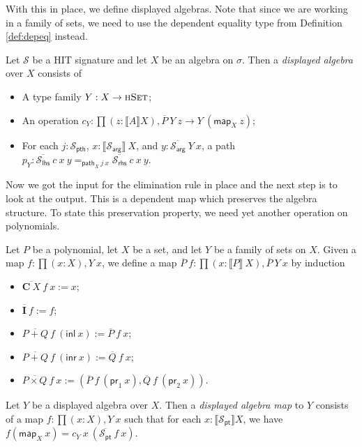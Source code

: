 \documentclass[9pt]{entcs}
\newcommand{\type}[1]{\textsc{#1}}
\newcommand{\term}[1]{\mathsf{#1}}
\newcommand{\constructor}[1]{\mathbf{#1}}
\newcommand{\function}[1]{\mathsf{#1}}
\newcommand{\deprod}[3]{\prod(#1 : #2), #3} %
\newcommand{\hset}{\type{hSet}} %
\newcommand{\0}{\textbf{0}} %
\newcommand{\inl}{\term{inl}} %
\newcommand{\inr}{\term{inr}} %
\newcommand{\prl}{\term{pr}_1} %
\newcommand{\prr}{\term{pr}_2} %
\newcommand{\depeq}[3]{#2 =_{#1} #3} %
\newcommand{\Def}{:=} %
\newcommand{\C}{\constructor{C}} %
\newcommand{\I}{\constructor{I}} %
\newcommand{\sumP}[2]{#1 + #2} %
\newcommand{\prodP}[2]{#1 \times #2} %
\newcommand{\pt}[0]{\textsf{pt}}
\newcommand{\pthI}[0]{\textsf{pth}}
\newcommand{\pthA}[0]{\textsf{arg}}
\newcommand{\pthlh}[0]{\textsf{lhs}}
\newcommand{\pthrh}[0]{\textsf{rhs}}
\newcommand{\pointc}[1]{#1_{\pt}} %
\newcommand{\pathI}[1]{#1_{\pthI}} %
\newcommand{\pathA}[1]{#1_{\pthA}} %
\newcommand{\pathlh}[1]{#1_{\pthlh}} %
\newcommand{\pathrh}[1]{#1_{\pthrh}} %
\newcommand{\sig}{\mathcal{S}} %
\newcommand{\semP}[1]{\llbracket #1 \rrbracket} %
\newcommand{\constrA}[1]{\function{map}_{#1}} %
\newcommand{\constrP}[1]{\function{path}_{#1}} %
\newcommand{\polydact}[2]{\overline{#1} \> #2} %
\newcommand{\epdact}[2]{\overline{#1} \> #2} %
\newcommand{\polydmap}[2]{\overline{#1} \> #2} %
\begin{document}
With this in place, we define displayed algebras.
Note that since we are working in a family of sets, we need to use the dependent equality type from Definition \ref{def:depeq} instead.

\begin{definition}
Let $\sig$ be a HIT signature and let $X$ be an algebra on $\sigma$.
Then a \emph{displayed algebra} over $X$ consists of
\begin{itemize}
	\item A type family $Y : X \rightarrow \hset$;
	\item An operation $c_Y : \deprod{z}{\semP{A}{X}}{\polydact{P}{Y} \> z \rightarrow Y \> (\constrA{X} \> z)}$;
	\item For each $j : \pathI{\sig}$, $x : \semP{\pathA{\sig}} \> X$, and $y : \polydact{\pathA{\sig}}{Y} \> x$,  a path $p_Y : \depeq{\constrP{X} \> j \> x}{\epdact{\pathlh{\sig}}{c} \> x \> y}{\epdact{\pathrh{\sig}}{c} \> x \> y}$.
\end{itemize} 
\end{definition}

Now we got the input for the elimination rule in place and the next step is to look at the output.
This is a dependent map which preserves the algebra structure.
To state this preservation property, we need yet another operation on polynomials.

\begin{definition}
Let $P$ be a polynomial, let $X$ be a set, and let $Y$ be a family of sets on $X$.
Given a map $f : \deprod{x}{X}{Y \> x}$, we define a map $\polydmap{P}{f} : \deprod{x}{\semP{P} \> X}{\polydact{P}{Y} \> x}$ by induction
\begin{itemize}
	\item $\polydmap{\C \> X}{f} \> x \Def x$;
	\item $\polydmap{\I}{f} \Def f$;
	\item $\polydmap{\sumP{P}{Q}}{f} \> (\inl \> x) \Def \polydmap{P}{f} \> x$;
	\item $\polydmap{\sumP{P}{Q}}{f} \> (\inr \> x) \Def \polydmap{Q}{f} \> x$;
	\item $\polydmap{\prodP{P}{Q}}{f} \> x \Def (\polydact{P}{f} \> (\prl \> x) , \polydact{Q}{f} \> (\prr \> x))$.
\end{itemize}
\end{definition}

\begin{definition}
Let $Y$ be a displayed algebra over $X$.
Then a \emph{displayed algebra map} to $Y$ consists of a map $f : \deprod{x}{X}{Y \> x}$ such that for each $x : \semP{\pointc{\sig}}{X}$, we have $f(\constrA{X} \> x) = c_Y \> x \> (\polydmap{\pointc{\sig}}{f} \> x)$.
\end{definition}
\end{document}
